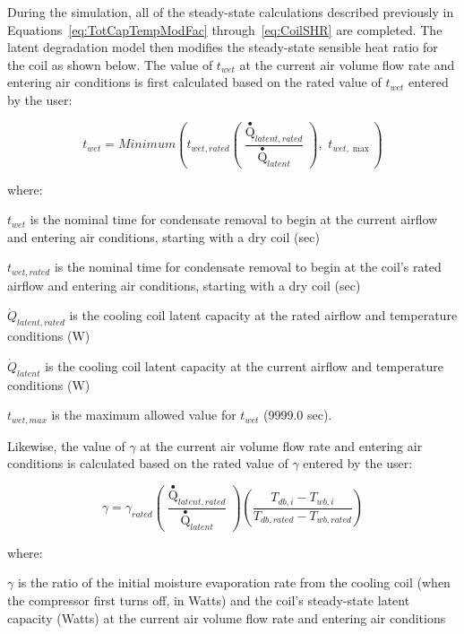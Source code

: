 During the simulation, all of the steady-state calculations described previously in Equations~\ref{eq:TotCapTempModFac} through~\ref{eq:CoilSHR} are completed. The latent degradation model then modifies the steady-state sensible heat ratio for the coil as shown below. The value of \(t_{wet}\) at the current air volume flow rate and entering air conditions is first calculated based on the rated value of \(t_{wet}\) entered by the user:

\begin{equation}
{t_{wet}} = Minimum\left( {{t_{wet,rated}}\left( {\frac{{{{\mathop Q\limits^ \bullet  }_{latent,rated}}}}{{{{\mathop Q\limits^ \bullet  }_{latent}}}}} \right),\,\,{t_{wet,\max }}} \right)
\end{equation}

where:

\(t_{wet}\) is the nominal time for condensate removal to begin at the current airflow and entering air conditions, starting with a dry coil (sec)

\(t_{wet,rated}\) is the nominal time for condensate removal to begin at the coil's rated airflow and entering air conditions, starting with a dry coil (sec)

\({\dot{Q}_{latent,rated}}\) is the cooling coil latent capacity at the rated airflow and temperature conditions (W)

\({\dot{Q}_{latent}}\) is the cooling coil latent capacity at the current airflow and temperature conditions (W)

\(t_{wet,max}\) is the maximum allowed value for \(t_{wet}\) (9999.0 sec).

Likewise, the value of \(\gamma\) at the current air volume flow rate and entering air conditions is calculated based on the rated value of \(\gamma\) entered by the user:

\begin{equation}
  \gamma = {\gamma_{rated}}\left( {\frac{{{{\mathop Q\limits^ \bullet  }_{latent,rated}}}}{{{{\mathop Q\limits^ \bullet  }_{latent}}}}} \right)\left( {\frac{{{T_{db,i}} - {T_{wb,i}}}}{{{T_{db,rated}} - {T_{wb,rated}}}}} \right)
\end{equation}

where:

\(\gamma\) is the ratio of the initial moisture evaporation rate from the cooling coil (when the compressor first turns off, in Watts) and the coil's steady-state latent capacity (Watts) at the current air volume flow rate and entering air conditions

